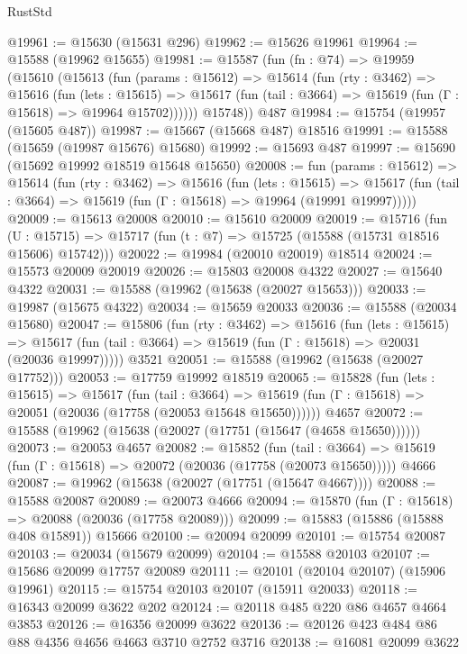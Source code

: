 \begin{lexlean}{RustStd}
\begin{coremodule}
@19961 := @15630 (@15631 @296)
@19962 := @15626 @19961
@19964 := @15588 (@19962 @15655)
@19981 := @15587
    (fun (fn : @74) =>
    @19959
      (@15610
        (@15613
          (fun (params : @15612) =>
          @15614
            (fun (rty : @3462) =>
            @15616
              (fun (lets : @15615) =>
              @15617 (fun (tail : @3664) => @15619 (fun (Γ : @15618) => @19964 @15702))))))
        @15748))
    @487
@19984 := @15754 (@19957 (@15605 @487))
@19987 := @15667 (@15668 @487) @18516
@19991 := @15588 (@15659 (@19987 @15676) @15680)
@19992 := @15693 @487
@19997 := @15690 (@15692 @19992 @18519 @15648 @15650)
@20008 := fun (params : @15612) =>
  @15614
    (fun (rty : @3462) =>
    @15616
      (fun (lets : @15615) =>
      @15617 (fun (tail : @3664) => @15619 (fun (Γ : @15618) => @19964 (@19991 @19997)))))
@20009 := @15613 @20008
@20010 := @15610 @20009
@20019 := @15716
    (fun (U : @15715) => @15717 (fun (t : @7) => @15725 (@15588 (@15731 @18516 @15606) @15742)))
@20022 := @19984 (@20010 @20019) @18514
@20024 := @15573 @20009 @20019
@20026 := @15803 @20008 @4322
@20027 := @15640 @4322
@20031 := @15588 (@19962 (@15638 (@20027 @15653)))
@20033 := @19987 (@15675 @4322)
@20034 := @15659 @20033
@20036 := @15588 (@20034 @15680)
@20047 := @15806
    (fun (rty : @3462) =>
    @15616
      (fun (lets : @15615) =>
      @15617 (fun (tail : @3664) => @15619 (fun (Γ : @15618) => @20031 (@20036 @19997)))))
    @3521
@20051 := @15588 (@19962 (@15638 (@20027 @17752)))
@20053 := @17759 @19992 @18519
@20065 := @15828
    (fun (lets : @15615) =>
    @15617
      (fun (tail : @3664) =>
      @15619 (fun (Γ : @15618) => @20051 (@20036 (@17758 (@20053 @15648 @15650))))))
    @4657
@20072 := @15588 (@19962 (@15638 (@20027 (@17751 (@15647 (@4658 @15650))))))
@20073 := @20053 @4657
@20082 := @15852
    (fun (tail : @3664) => @15619 (fun (Γ : @15618) => @20072 (@20036 (@17758 (@20073 @15650)))))
    @4666
@20087 := @19962 (@15638 (@20027 (@17751 (@15647 @4667))))
@20088 := @15588 @20087
@20089 := @20073 @4666
@20094 := @15870 (fun (Γ : @15618) => @20088 (@20036 (@17758 @20089)))
@20099 := @15883 (@15886 (@15888 @408 @15891)) @15666
@20100 := @20094 @20099
@20101 := @15754 @20087
@20103 := @20034 (@15679 @20099)
@20104 := @15588 @20103
@20107 := @15686 @20099 @17757 @20089
@20111 := @20101 (@20104 @20107) (@15906 @19961)
@20115 := @15754 @20103 @20107 (@15911 @20033)
@20118 := @16343 @20099 @3622 @202
@20124 := @20118 @485 @220 @86 @4657 @4664 @3853
@20126 := @16356 @20099 @3622
@20136 := @20126 @423 @484 @86 @88 @4356 @4656 @4663 @3710 @2752 @3716
@20138 := @16081 @20099 @3622

\end{coremodule}
\end{lexlean}
